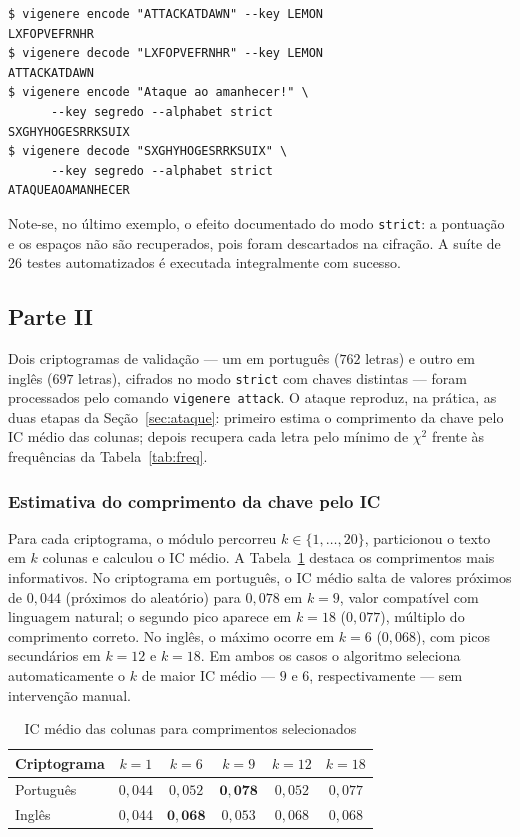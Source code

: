 \documentclass[conference]{IEEEtran}
\begin{document}
\begin{lstlisting}[language={}]
$ vigenere encode "ATTACKATDAWN" --key LEMON
LXFOPVEFRNHR
$ vigenere decode "LXFOPVEFRNHR" --key LEMON
ATTACKATDAWN
$ vigenere encode "Ataque ao amanhecer!" \
      --key segredo --alphabet strict
SXGHYHOGESRRKSUIX
$ vigenere decode "SXGHYHOGESRRKSUIX" \
      --key segredo --alphabet strict
ATAQUEAOAMANHECER
\end{lstlisting}

Note-se, no último exemplo, o efeito documentado do modo \texttt{strict}: a
pontuação e os espaços não são recuperados, pois foram descartados na
cifração. A suíte de 26 testes automatizados é executada integralmente com
sucesso.

\subsection{Parte II}
Dois criptogramas de validação --- um em português ($762$ letras) e outro em
inglês ($697$ letras), cifrados no modo \texttt{strict} com chaves distintas
--- foram processados pelo comando \texttt{vigenere attack}. O ataque
reproduz, na prática, as duas etapas da Seção~\ref{sec:ataque}: primeiro
estima o comprimento da chave pelo IC médio das colunas; depois recupera cada
letra pelo mínimo de $\chi^2$ frente às frequências da
Tabela~\ref{tab:freq}.

\subsubsection{Estimativa do comprimento da chave pelo IC}
Para cada criptograma, o módulo percorreu $k \in \{1,\dots,20\}$, particionou
o texto em $k$ colunas e calculou o IC médio. A Tabela~\ref{tab:ic} destaca
os comprimentos mais informativos. No criptograma em português, o IC médio
salta de valores próximos de $0{,}044$ (próximos do aleatório) para
$0{,}078$ em $k=9$, valor compatível com linguagem natural; o segundo pico
aparece em $k=18$ ($0{,}077$), múltiplo do comprimento correto. No inglês, o
máximo ocorre em $k=6$ ($0{,}068$), com picos secundários em $k=12$ e
$k=18$. Em ambos os casos o algoritmo seleciona automaticamente o $k$ de
maior IC médio --- $9$ e $6$, respectivamente --- sem intervenção manual.

\begin{table}[htbp]
\caption{IC médio das colunas para comprimentos selecionados}
\label{tab:ic}
\centering
\footnotesize
\begin{tabular}{@{}lccccc@{}}
\toprule
\textbf{Criptograma} & $k{=}1$ & $k{=}6$ & $k{=}9$ & $k{=}12$ & $k{=}18$ \\
\midrule
Português & $0{,}044$ & $0{,}052$ & $\mathbf{0{,}078}$ & $0{,}052$ & $0{,}077$ \\
Inglês    & $0{,}044$ & $\mathbf{0{,}068}$ & $0{,}053$ & $0{,}068$ & $0{,}068$ \\
\bottomrule
\end{tabular}
\end{table}
\end{document}
